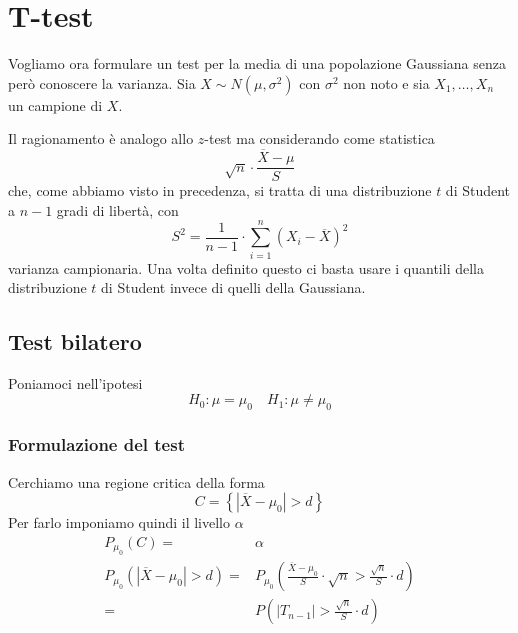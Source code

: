\section{T-test}
Vogliamo ora formulare un test per la media di una popolazione Gaussiana senza però conoscere la
varianza. Sia $X \sim N(\mu, \sigma^2)$ con $\sigma^2$ non noto e sia $X_1, \dots, X_n$ un campione
\iid di $X$.

Il ragionamento è analogo allo $z$-test ma considerando come statistica
\[ \sqrt{n} \cdot \frac{\overline{X} - \mu}{S} \]
che, come abbiamo visto in precedenza, si tratta di una distribuzione $t$ di Student a $n-1$ gradi
di libertà, con
\[ S^2 = \frac{1}{n-1} \cdot \sum_{i=1}^n \left( X_i - \overline{X} \right)^2 \]
varianza campionaria. Una volta definito questo ci basta usare i quantili della distribuzione $t$
di Student invece di quelli della Gaussiana.

\subsection{Test bilatero}
Poniamoci nell'ipotesi
\[ H_0: \mu = \mu_0 \quad H_1: \mu \neq \mu_0 \]

\subsubsection{Formulazione del test}
Cerchiamo una regione critica della forma
\[ C = \left\{ |\overline{X} - \mu_0| > d \right\} \]
Per farlo imponiamo quindi il livello $\alpha$
\begin{align*}
	P_{\mu_0} (C) =                          & \alpha \\
	P_{\mu_0} (|\overline{X} - \mu_0| > d) = &
	P_{\mu_0} \left( \frac{\overline{X} - \mu_0}{S} \cdot \sqrt{n} >
	\frac{\sqrt{n}}{S} \cdot d \right)                \\
	=                                        &
	P \left( |T_{n-1}| > \frac{\sqrt{n}}{S} \cdot d \right)
\end{align*}